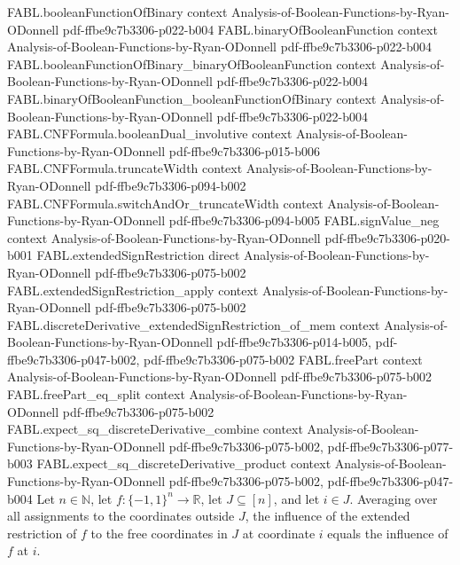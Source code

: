 \begin{theorem}
\proofstep
  {FABL.booleanFunctionOfBinary}
  {context}
  {Analysis-of-Boolean-Functions-by-Ryan-ODonnell}
  {pdf-ffbe9c7b3306-p022-b004}
\proofstep
  {FABL.binaryOfBooleanFunction}
  {context}
  {Analysis-of-Boolean-Functions-by-Ryan-ODonnell}
  {pdf-ffbe9c7b3306-p022-b004}
\proofstep
  {FABL.booleanFunctionOfBinary_binaryOfBooleanFunction}
  {context}
  {Analysis-of-Boolean-Functions-by-Ryan-ODonnell}
  {pdf-ffbe9c7b3306-p022-b004}
\proofstep
  {FABL.binaryOfBooleanFunction_booleanFunctionOfBinary}
  {context}
  {Analysis-of-Boolean-Functions-by-Ryan-ODonnell}
  {pdf-ffbe9c7b3306-p022-b004}
\proofstep
  {FABL.CNFFormula.booleanDual_involutive}
  {context}
  {Analysis-of-Boolean-Functions-by-Ryan-ODonnell}
  {pdf-ffbe9c7b3306-p015-b006}
\proofstep
  {FABL.CNFFormula.truncateWidth}
  {context}
  {Analysis-of-Boolean-Functions-by-Ryan-ODonnell}
  {pdf-ffbe9c7b3306-p094-b002}
\proofstep
  {FABL.CNFFormula.switchAndOr_truncateWidth}
  {context}
  {Analysis-of-Boolean-Functions-by-Ryan-ODonnell}
  {pdf-ffbe9c7b3306-p094-b005}
\proofstep
  {FABL.signValue_neg}
  {context}
  {Analysis-of-Boolean-Functions-by-Ryan-ODonnell}
  {pdf-ffbe9c7b3306-p020-b001}
\proofstep
  {FABL.extendedSignRestriction}
  {direct}
  {Analysis-of-Boolean-Functions-by-Ryan-ODonnell}
  {pdf-ffbe9c7b3306-p075-b002}
\proofstep
  {FABL.extendedSignRestriction_apply}
  {context}
  {Analysis-of-Boolean-Functions-by-Ryan-ODonnell}
  {pdf-ffbe9c7b3306-p075-b002}
\proofstep
  {FABL.discreteDerivative_extendedSignRestriction_of_mem}
  {context}
  {Analysis-of-Boolean-Functions-by-Ryan-ODonnell}
  {pdf-ffbe9c7b3306-p014-b005,
    pdf-ffbe9c7b3306-p047-b002,
    pdf-ffbe9c7b3306-p075-b002}
\proofstep
  {FABL.freePart}
  {context}
  {Analysis-of-Boolean-Functions-by-Ryan-ODonnell}
  {pdf-ffbe9c7b3306-p075-b002}
\proofstep
  {FABL.freePart_eq_split}
  {context}
  {Analysis-of-Boolean-Functions-by-Ryan-ODonnell}
  {pdf-ffbe9c7b3306-p075-b002}
\proofstep
  {FABL.expect_sq_discreteDerivative_combine}
  {context}
  {Analysis-of-Boolean-Functions-by-Ryan-ODonnell}
  {pdf-ffbe9c7b3306-p075-b002,
    pdf-ffbe9c7b3306-p077-b003}
\proofstep
  {FABL.expect_sq_discreteDerivative_product}
  {context}
  {Analysis-of-Boolean-Functions-by-Ryan-ODonnell}
  {pdf-ffbe9c7b3306-p075-b002,
    pdf-ffbe9c7b3306-p047-b004}
Let $n\in\mathbb N$, let $f:\{−1,1\}^n\to\mathbb R$, let $J\subseteq[n]$, and let $i\in
J$. Averaging over all assignments to the coordinates outside $J$, the influence of the
extended restriction of $f$ to the free coordinates in $J$ at coordinate $i$ equals the
influence of $f$ at $i$.
\end{theorem}

